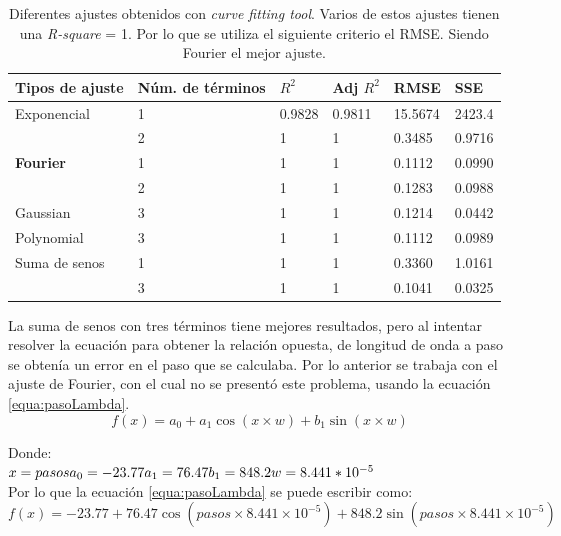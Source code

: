  \begin{table} [h]
\centering
\caption{Diferentes ajustes obtenidos con \textit{curve fitting tool}. Varios de estos ajustes tienen una \textit{R-square} = 1. Por lo que se utiliza el siguiente criterio el RMSE. Siendo Fourier el mejor ajuste.}
\label{tabla:ajustes}
\begin{tabular}{|p{30mm}|p{30mm}|p{10mm}|p{12mm}|p{12mm}|p{12mm}|}
	\hline 
	Tipos de ajuste&Núm. de términos & $R^{2}$ & Adj $R^{2}$& RMSE & SSE \\ 
	\hline 
	Exponencial  & 1 & 0.9828 & 0.9811 & 15.5674 & 2423.4 \\ 
	\hline 
	& 2 & 1& 1 & 0.3485 & 0.9716 \\ 
	\hline 
	\textbf{Fourier} & 1 & 1 & 1 & 0.1112 & 0.0990 \\ 
	\hline 
	& 2 & 1 & 1 & 0.1283 & 0.0988 \\ 
	\hline 
	Gaussian & 3 & 1 & 1 & 0.1214 & 0.0442 \\ 	\hline 
	Polynomial & 3 & 1 & 1 & 0.1112 & 0.0989 \\ 
	\hline 
	Suma de senos & 1 & 1 & 1 & 0.3360 & 1.0161 \\ 
	\hline 
	& 3 & 1 & 1 & 0.1041 & 0.0325 \\ 
	\hline 
\end{tabular} 

\end{table}
La suma de senos con tres términos tiene mejores resultados, pero al intentar resolver la ecuación para obtener la relación opuesta, de longitud de onda a paso se obtenía un error en el paso que se calculaba. Por lo anterior se trabaja con el ajuste de Fourier, con el cual no se presentó este problema, usando la ecuación \ref{equa:pasoLambda}.
\begin{equation}
f(x) = a_0 + a_1\cos (x\times w) + b_1 \sin(x \times w)
\label{equa:pasoLambda}
\end{equation}

Donde: \\
$x = pasos\\
a_0 =-23.77\\
a_1 = 76.47 \\  %
b_1 = 848.2 \\  %
w = 8.441*10^{-5}$\\  %
Por lo que la ecuación \ref{equa:pasoLambda} se puede escribir como:\\
\begin{equation}
f(x) =-23.77+76.47 \cos(pasos \times8.441\times10^{-5}) +848.2 \sin(pasos \times8.441\times10^{-5})
\label{equa:pasoLambda2}
\end{equation}

